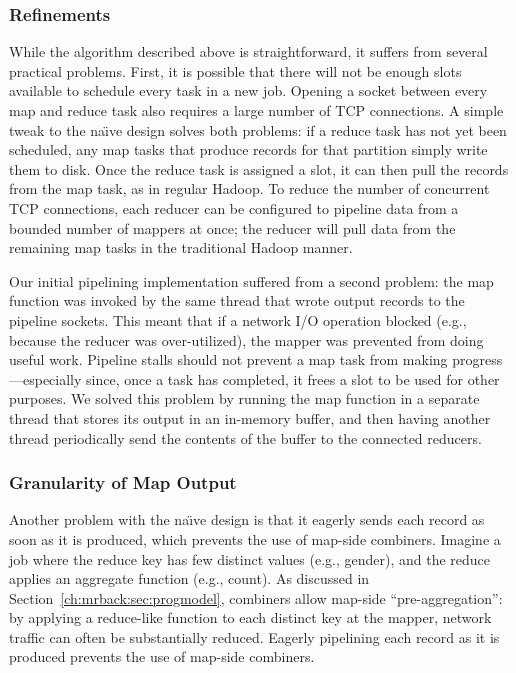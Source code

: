 \subsubsection{Refinements}
\label{ch:hop:sec:pipe-refine}
While the algorithm described above is straightforward, it suffers
from several practical problems. First, it is possible that there will
not be enough slots available to schedule every task in a new
job. Opening a socket between every map and reduce task also requires
a large number of TCP connections. A simple tweak to the na\"{\i}ve
design solves both problems: if a reduce task has not yet been
scheduled, any map tasks that produce records for that partition
simply write them to disk. Once the reduce task is assigned a slot, it
can then pull the records from the map task, as in regular Hadoop.  To
reduce the number of concurrent TCP connections, each reducer can be
configured to pipeline data from a bounded number of mappers at once; the
reducer will pull data from the remaining map tasks in the traditional
Hadoop manner.

Our initial pipelining implementation suffered from a second problem: the map
function was invoked by the same thread that wrote output records to the
pipeline sockets. This meant that if a network I/O operation blocked (e.g.,
because the reducer was over-utilized), the mapper was prevented from doing
useful work. Pipeline stalls should not prevent a map task from making
progress---especially since, once a task has completed, it frees a {\TT} slot
to be used for other purposes. We solved this problem by running the map
function in a separate thread that stores its output in an in-memory buffer, and
then having another thread periodically send the contents of the buffer to the
connected reducers.

\subsubsection{Granularity of Map Output}
\label{ch:hop:sec:mapout}

Another problem with the na\"{\i}ve design is that it eagerly sends
each record as soon as it is produced, which prevents the use of
map-side combiners. Imagine a job where the reduce key has few
distinct values (e.g., gender), and the reduce applies an aggregate
function (e.g., count). As discussed in Section~\ref{ch:mrback:sec:progmodel},
combiners allow map-side ``pre-aggregation'': by applying a
reduce-like function to each distinct key at the mapper, network
traffic can often be substantially reduced. Eagerly pipelining each
record as it is produced prevents the use of map-side combiners.

